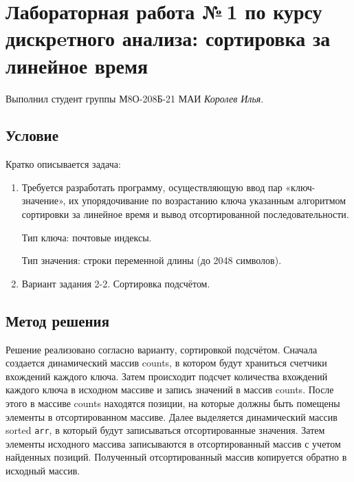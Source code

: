 \documentclass[12pt]{article}
\begin{document}
\section*{Лабораторная работа №\,1 по курсу дискрeтного анализа: сортировка за линейное время}

Выполнил студент группы М8О-208Б-21 МАИ \textit{Королев Илья}.

\subsection*{Условие}

Кратко описывается задача: 
\begin{enumerate}
\item Требуется разработать программу, осуществляющую ввод пар «ключ-значение», их упорядочивание по возрастанию ключа указанным алгоритмом сортировки за линейное время и вывод отсортированной последовательности.

Тип ключа: почтовые индексы.

Тип значения: строки переменной длины (до 2048 символов).
\item Вариант задания 2-2. Сортировка подсчётом.
\end{enumerate}

\subsection*{Метод решения}

Решение реализовано согласно варианту, сортировкой подсчётом. Сначала создается динамический массив counts, в котором будут храниться счетчики вхождений каждого ключа. Затем происходит подсчет количества вхождений каждого ключа в исходном массиве и запись значений в массив counts. После этого в массиве counts находятся позиции, на которые должны быть помещены элементы в отсортированном массиве.
Далее выделяется динамический массив sorted \verb|arr|, в который будут записываться отсортированные значения. Затем элементы исходного массива записываются в отсортированный массив с учетом найденных позиций. Полученный отсортированный массив копируется обратно в исходный массив.
\end{document}
